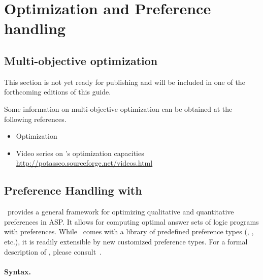 
\section{Optimization and Preference handling}
\label{sec:prefopt}

\subsection{Multi-objective optimization}
\label{sec:oprimization}

This section is not yet ready for publishing
and will be included in one of the forthcoming editions of this guide.

Some information on multi-objective optimization
can be obtained at the following references.

\begin{itemize}
\item Optimization \cite{gekakasc11b,gekakasc11c,gekasc11b,ankamasc12a}
\item Video series on \clasp's optimization capacities \url{http://potassco.sourceforge.net/videos.html}
\end{itemize}

\subsection{Preference Handling with \asprin}\label{sec:asprin}
\asprin\ provides a general framework for optimizing qualitative and quantitative preferences in ASP.
It allows for computing optimal answer sets of logic programs with preferences.
While \asprin\ comes with a library of predefined preference types 
(, , etc.),
it is readily extensible by new customized preference types.
For a formal description of \asprin, please consult~\cite{brderosc15a}. 



\paragraph{Syntax.}

